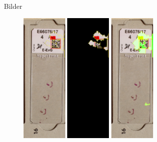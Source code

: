 \documentclass{beamer}
\begin{document}
  \begin{frame}{Bilder}
    \begin{figure}
      \includegraphics[width=0.2\textwidth]{./assets/Cell100325_1_6_top1_positiveonlywithrest.PNG}
      \hfill
      \includegraphics[width=0.2\textwidth]{./assets/Cell100325_1_6_top1_positiveonly.PNG}
      \hfill
      \includegraphics[width=0.2\textwidth]{./assets/Cell100325_1_6_top1_proscons.PNG}

\end{figure}
\end{frame}
\end{document}
